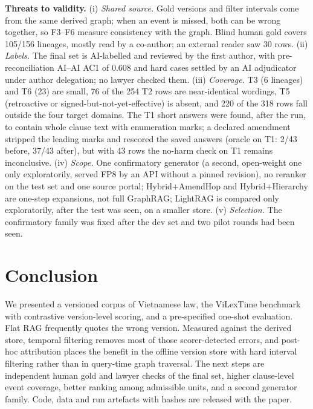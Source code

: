\documentclass[sigconf,anonymous,review]{acmart}
\newcommand{\sys}[1]{\textsf{#1}}
\begin{document}
\textbf{Threats to validity.} (i) \emph{Shared source.} Gold versions and filter intervals come from the same derived graph; when an event is missed, both can be wrong together, so F3--F6 measure consistency with the graph. Blind human gold covers 105/156 lineages, mostly read by a co-author; an external reader saw 30 rows. (ii) \emph{Labels.} The final set is AI-labelled and reviewed by the first author, with pre-reconciliation AI--AI AC1 of 0.608 and hard cases settled by an AI adjudicator under author delegation; no lawyer checked them. (iii) \emph{Coverage.} T3 (6 lineages) and T6 (23) are small, 76 of the 254 T2 rows are near-identical wordings, T5 (retroactive or signed-but-not-yet-effective) is absent, and 220 of the 318 rows fall outside the four target domains. The T1 short answers were found, after the run, to contain whole clause text with enumeration marks; a declared amendment stripped the leading marks and rescored the saved answers (oracle on T1: 2/43 before, 37/43 after), but with 43 rows the no-harm check on T1 remains inconclusive. (iv) \emph{Scope.} One confirmatory generator (a second, open-weight one only exploratorily, served FP8 by an API without a pinned revision), no reranker on the test set and one source portal; \sys{Hybrid+\allowbreak AmendHop} and \sys{Hybrid+\allowbreak Hierarchy} are one-step expansions, not full GraphRAG; LightRAG is compared only exploratorily, after the test was seen, on a smaller store. (v) \emph{Selection.} The confirmatory family was fixed after the dev set and two pilot rounds had been seen.

\section{Conclusion}
\label{sec:conclusion}

We presented a versioned corpus of Vietnamese law, the ViLexTime benchmark with contrastive version-level scoring, and a pre-specified one-shot evaluation. Flat RAG frequently quotes the wrong version. Measured against the derived store, temporal filtering removes most of those scorer-detected errors, and post-hoc attribution places the benefit in the offline version store with hard interval filtering rather than in query-time graph traversal. The next steps are independent human gold and lawyer checks of the final set, higher clause-level event coverage, better ranking among admissible units, and a second generator family. Code, data and run artefacts with hashes are released with the paper.
\end{document}
